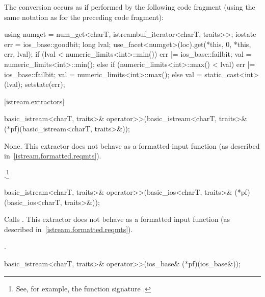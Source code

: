 \begin{itemdescr}
\pnum
The conversion occurs as if performed by the following code fragment
(using the same notation as for the preceding code fragment):
\begin{codeblock}
using numget = num_get<charT, istreambuf_iterator<charT, traits>>;
iostate err = ios_base::goodbit;
long lval;
use_facet<numget>(loc).get(*this, 0, *this, err, lval);
if (lval < numeric_limits<int>::min()) {
  err |= ios_base::failbit;
  val = numeric_limits<int>::min();
} else if (numeric_limits<int>::max() < lval) {
  err |= ios_base::failbit;
  val = numeric_limits<int>::max();
}  else
  val = static_cast<int>(lval);
setstate(err);
\end{codeblock}
\end{itemdescr}

[istream.extractors]{}

%
\begin{itemdecl}
basic_istream<charT, traits>&
  operator>>(basic_istream<charT, traits>& (*pf)(basic_istream<charT, traits>&));
\end{itemdecl}

\begin{itemdescr}
\pnum
\effects
None.
This extractor does not behave as a formatted input function
(as described in~\ref{istream.formatted.reqmts}).

\pnum
\returns
{}.\footnote{See, for example, the function signature
.%
}%
\end{itemdescr}

%
\begin{itemdecl}
basic_istream<charT, traits>&
  operator>>(basic_ios<charT, traits>& (*pf)(basic_ios<charT, traits>&));
\end{itemdecl}

\begin{itemdescr}
\pnum
\effects
Calls
.
This extractor does not behave as a formatted input function
(as described in~\ref{istream.formatted.reqmts}).

\pnum
\returns
{}.
\end{itemdescr}

%
\begin{itemdecl}
basic_istream<charT, traits>& operator>>(ios_base& (*pf)(ios_base&));
\end{itemdecl}

